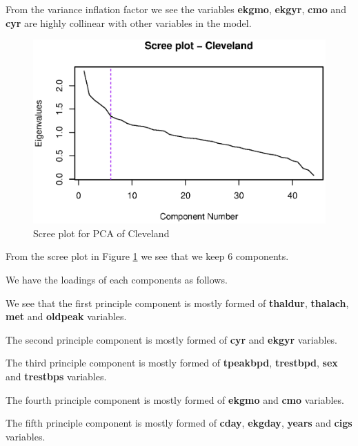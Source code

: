 \documentclass[a4paper]{article}
\begin{document}


From the variance inflation factor we see the variables \textbf{ekgmo}, \textbf{ekgyr}, \textbf{cmo} and \textbf{cyr} are highly collinear with other variables in the model.

\begin{figure}[H]
	\begin{center}
		\includegraphics[width=12cm]{question3output/clescreeplot.eps}
	\end{center}
	\caption{Scree plot for PCA of Cleveland}
	\label{q3-cle-screeplot}
\end{figure}

From the scree plot in Figure \ref{q3-cle-screeplot} we see that we keep 6 components.

We have the loadings of each components as follows.



We see that the first principle component is mostly formed of \textbf{thaldur}, \textbf{thalach}, \textbf{met} and \textbf{oldpeak} variables.

The second principle component is mostly formed of \textbf{cyr} and \textbf{ekgyr} variables.

The third principle component is mostly formed of \textbf{tpeakbpd}, \textbf{trestbpd}, \textbf{sex} and \textbf{trestbps} variables.

The fourth principle component is mostly formed of \textbf{ekgmo} and \textbf{cmo} variables.

The fifth principle component is mostly formed of \textbf{cday}, \textbf{ekgday}, \textbf{years} and \textbf{cigs} variables.
\end{document}

